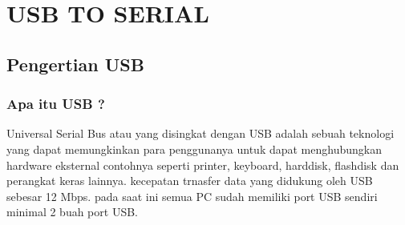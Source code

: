 
\section {USB TO SERIAL}

\subsection {Pengertian USB}
\subsubsection {Apa itu USB ?}
	Universal Serial Bus atau yang disingkat dengan USB adalah sebuah teknologi yang dapat memungkinkan para penggunanya untuk dapat menghubungkan hardware eksternal contohnya seperti printer, keyboard, harddisk, flashdisk dan perangkat keras lainnya. kecepatan trnasfer data yang didukung oleh USB sebesar 12 Mbps. pada saat ini semua PC sudah memiliki port USB sendiri minimal 2 buah port USB.

